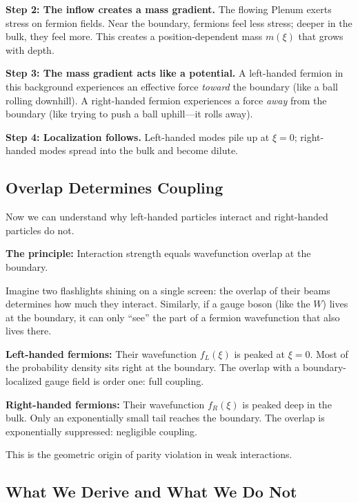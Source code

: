 \textbf{Step 2: The inflow creates a mass gradient.} The flowing Plenum exerts
stress on fermion fields. Near the boundary, fermions feel less stress; deeper
in the bulk, they feel more. This creates a position-dependent mass $m(\xi)$ that
grows with depth.

\textbf{Step 3: The mass gradient acts like a potential.} A left-handed fermion
in this background experiences an effective force \emph{toward} the boundary
(like a ball rolling downhill). A right-handed fermion experiences a force
\emph{away} from the boundary (like trying to push a ball uphill---it rolls away).

\textbf{Step 4: Localization follows.} Left-handed modes pile up at $\xi = 0$;
right-handed modes spread into the bulk and become dilute.


\subsection{Overlap Determines Coupling}

Now we can understand why left-handed particles interact and right-handed
particles do not.

\textbf{The principle:} Interaction strength equals wavefunction overlap at the
boundary.

Imagine two flashlights shining on a single screen: the overlap of their beams
determines how much they interact. Similarly, if a gauge boson (like the $W$)
lives at the boundary, it can only ``see'' the part of a fermion wavefunction
that also lives there.

\textbf{Left-handed fermions:} Their wavefunction $f_L(\xi)$ is peaked at $\xi = 0$.
Most of the probability density sits right at the boundary. The overlap with
a boundary-localized gauge field is order one: full coupling.

\textbf{Right-handed fermions:} Their wavefunction $f_R(\xi)$ is peaked deep in
the bulk. Only an exponentially small tail reaches the boundary. The overlap
is exponentially suppressed: negligible coupling.

This is the geometric origin of parity violation in weak interactions.


\subsection{What We Derive and What We Do Not}

